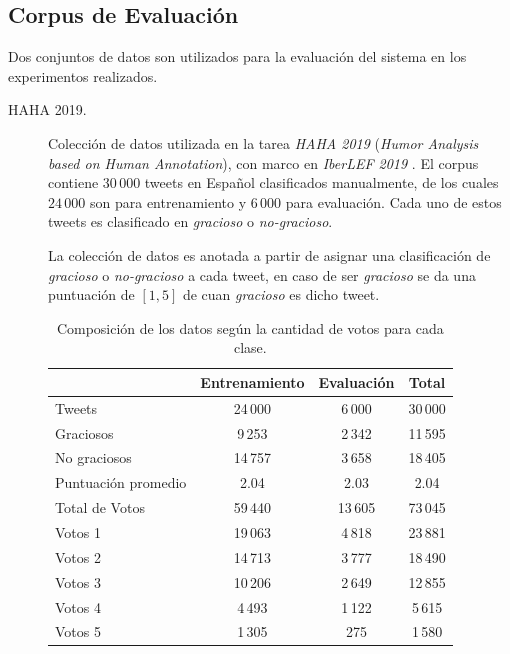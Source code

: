 \subsection{Corpus de Evaluación}\label{section:evaluation-corpus}

Dos conjuntos de datos son utilizados para la evaluación del sistema en los experimentos realizados.

\begin{description}

\item[HAHA 2019.]
Colección de datos utilizada en la tarea \emph{HAHA 2019} (\emph{Humor Analysis based on Human Annotation}), con marco en \emph{IberLEF 2019} \parencite{chiruzzo2019overview}.
El corpus contiene $30\,000$ tweets en Español clasificados manualmente, de los cuales $24\,000$ son para entrenamiento y $6\,000$ para evaluación.
Cada uno de estos tweets es clasificado en \emph{gracioso} o \emph{no-gracioso}.

La colección de datos es anotada a partir de asignar una clasificación de \emph{gracioso} o \emph{no-gracioso} a cada tweet, en caso de ser \emph{gracioso} se da una puntuación de $[1,5]$ de cuan \emph{gracioso} es dicho tweet.

\begin{table}[h]
    \centering
    \begin{tabular}{lccc}
    \toprule
                            & Entrenamiento & Evaluación & Total   \\\midrule
        Tweets              & 24\,000       & 6\,000     & 30\,000 \\
        Graciosos           & 9\,253        & 2\,342     & 11\,595 \\
        No graciosos        & 14\,757       & 3\,658     & 18\,405 \\
        Puntuación promedio & 2.04          & 2.03       & 2.04    \\\midrule
        Total de Votos      & 59\,440       & 13\,605    & 73\,045 \\
        Votos 1             & 19\,063       & 4\,818     & 23\,881 \\
        Votos 2             & 14\,713       & 3\,777     & 18\,490 \\
        Votos 3             & 10\,206       & 2\,649     & 12\,855 \\
        Votos 4             &  4\,493       & 1\,122     &  5\,615 \\
        Votos 5             &  1\,305       &    275     &  1\,580 \\
    \bottomrule
    \end{tabular}
    \caption{Composición de los datos según la cantidad de votos para cada clase.}
    \label{table:haha2019info}
\end{table}


\end{description}
